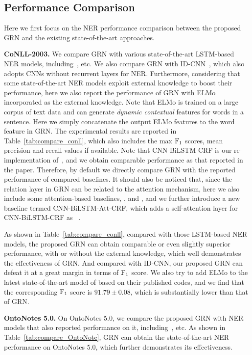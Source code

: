\documentclass[letterpaper]{article} \usepackage{aaai19}  \usepackage{times}  \usepackage{helvet}  \usepackage{courier}  \usepackage{url}  \usepackage{graphicx}  \usepackage{amsmath}
\newcommand{\ie}{\text{i.e.,}}
\newcommand{\GRN}{GRN}
\begin{document}
\subsection{Performance Comparison}
Here we first focus on the NER performance comparison between the proposed \GRN{} and the existing state-of-the-art approaches.

\textbf{CoNLL-2003.} We compare \GRN{} with various state-of-the-art LSTM-based NER models, including~\cite{Liu2018Empower,Ye2018HSCRF}, etc. We also compare \GRN{} with ID-CNN~\cite{strubell2017fast}, which also adopts CNNs without recurrent layers for NER. Furthermore, considering that some state-of-the-art NER models exploit external knowledge to boost their performance, here we also report the performance of \GRN{} with ELMo~\cite{peters2018deep} incorporated as the external knowledge. Note that ELMo is trained on a large corpus of text data and can generate \textit{dynamic contextual} features for words in a sentence. Here we simply concatenate the output ELMo features to the word feature in \GRN{}. The experimental results are reported in Table~\ref{tab:compare_conll}, which also includes the max $\rm F_1$ scores, mean precision and recall values if available. Note that CNN-BiLSTM-CRF is our re-implementation of~\cite{ma2016CNNBLSTMCRF}, and we obtain comparable performance as that reported in the paper. Therefore, by default we directly compare \GRN{} with the reported performance of compared baselines. It should also be noticed that, since the relation layer in \GRN{} can be related to the attention mechanism, here we also include some attention-based baselines, \ie, \cite{rei2016attending} and \cite{zukov2017neural}, and we further introduce a new baseline termed CNN-BiLSTM-Att-CRF, which adds a self-attention layer for CNN-BiLSTM-CRF as ~\cite{zukov2017neural}.

As shown in Table~\ref{tab:compare_conll}, compared with those LSTM-based NER models, the proposed \GRN{} can obtain comparable or even slightly superior performance, with or without the external knowledge, which well demonstrates the effectiveness of \GRN{}. And compared with ID-CNN, our proposed \GRN{} can defeat it at a great margin in terms of $\rm{F_1}$ score. We also try to add ELMo to the latest state-of-the-art model of \cite{Ye2018HSCRF} based on their published codes, and we find that the corresponding $\rm{F_1}$ score is $91.79\pm0.08$, which is substantially lower than that of \GRN{}.



\textbf{OntoNotes 5.0.}
On OntoNotes 5.0, we compare the proposed \GRN{} with NER models that also reported performance on it,  including~\cite{chiu2016named,shen2017deep,durrett2014joint}, etc. As shown in Table~\ref{tab:compare_OntoNote}, \GRN{} can obtain the state-of-the-art NER performance on OntoNotes 5.0, which further demonstrates its effectiveness.
\end{document}

